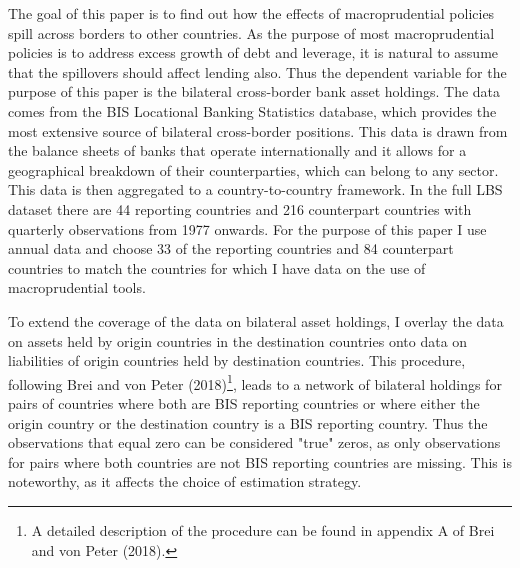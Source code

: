 \documentclass[12pt,a4paper]{article}
\begin{document}
The goal of this paper is to find out how the effects of macroprudential policies spill across borders to other countries. As the purpose of most macroprudential policies is to address excess growth of debt and leverage, it is natural to assume that the spillovers should affect lending also. Thus the dependent variable for the purpose of this paper is the bilateral cross-border bank asset holdings. The data comes from the BIS Locational Banking Statistics database, which provides the most extensive source of bilateral cross-border positions. This data is drawn from the balance sheets of banks that operate internationally and it allows for a geographical breakdown of their counterparties, which can belong to any sector. This data is then aggregated to a country-to-country framework. In the full LBS dataset there are 44 reporting countries and 216 counterpart countries with quarterly observations from 1977 onwards. For the purpose of this paper I use annual data and choose 33 of the reporting countries and 84 counterpart countries to match the countries for which I have data on the use of macroprudential tools. 

To extend the coverage of the data on bilateral asset holdings, I overlay the data on assets held by origin countries in the destination countries onto data on liabilities of origin countries held by destination countries. This procedure, following Brei and von Peter (2018)\footnote{A detailed description of the procedure can be found in appendix A of Brei and von Peter (2018).}, leads to a network of bilateral holdings for pairs of countries where both are BIS reporting countries or where either the origin country or the destination country is a BIS reporting country. Thus the observations that equal zero can be considered "true" zeros, as only observations for pairs where both countries are not BIS reporting countries are missing. This is noteworthy, as it affects the choice of estimation strategy.
\end{document}
